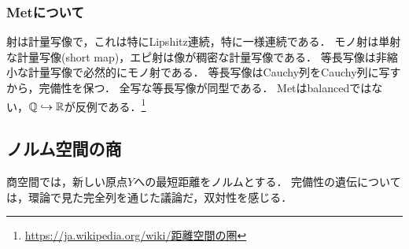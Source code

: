 \documentclass[uplatex,dvipdfmx]{jsreport}
\begin{document}
\subsubsection{Metについて}

\begin{tcolorbox}[colframe=ForestGreen, colback=ForestGreen!10!white,breakable,colbacktitle=ForestGreen!40!white,coltitle=black,fonttitle=\bfseries\sffamily,
title=]
    射は計量写像で，これは特にLipshitz連続，特に一様連続である．
    モノ射は単射な計量写像(short map)，エピ射は像が稠密な計量写像である．
    等長写像は非縮小な計量写像で必然的にモノ射である．
    等長写像はCauchy列をCauchy列に写すから，完備性を保つ．
    全写な等長写像が同型である．
    Metはbalancedではない，$\mathbb{Q}\hookrightarrow\mathbb{R}$が反例である．\footnote{\url{https://ja.wikipedia.org/wiki/距離空間の圏}}
\end{tcolorbox}

\subsection{ノルム空間の商}

\begin{tcolorbox}[colframe=ForestGreen, colback=ForestGreen!10!white,breakable,colbacktitle=ForestGreen!40!white,coltitle=black,fonttitle=\bfseries\sffamily,
title=]
    商空間では，新しい原点$Y$への最短距離をノルムとする．
    完備性の遺伝については，環論で見た完全列を通じた議論だ，双対性を感じる．
\end{tcolorbox}
\end{document}
